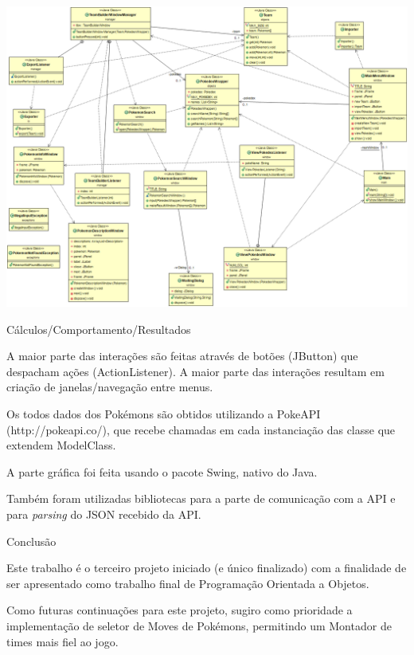 \documentclass[
	article,			%
	12pt,				%
	oneside,			%
	a4paper,			%
	english,			%
	brazil,				%
	sumario=tradicional
	]{abntex2}
\begin{document}
\begin{center}
\includegraphics[width=1\textwidth]{Class_Diagram}\par
\end{center}

\newpage
\begin{center}
{\HUGE Cálculos/Comportamento/Resultados}
\end{center}

A maior parte das interações são feitas através de botões (JButton) que despacham ações (ActionListener). A maior parte das interações resultam em criação de janelas/navegação entre menus.

Os todos dados dos Pokémons são obtidos utilizando a PokeAPI (http://pokeapi.co/), que recebe chamadas em cada instanciação das classe que extendem ModelClass.

A parte gráfica foi feita usando o pacote Swing, nativo do Java.

Também foram utilizadas bibliotecas para a parte de comunicação com a API e para \textit{parsing} do JSON recebido da API.

\vspace{1cm}

\begin{center}
{\HUGE Conclusão}
\end{center}

Este trabalho é o terceiro projeto iniciado (e único finalizado) com a finalidade de ser apresentado como trabalho final de Programação Orientada a Objetos.

Como futuras continuações para este projeto, sugiro como prioridade a implementação de seletor de Moves de Pokémons, permitindo um Montador de times mais fiel ao jogo.
\end{document}
